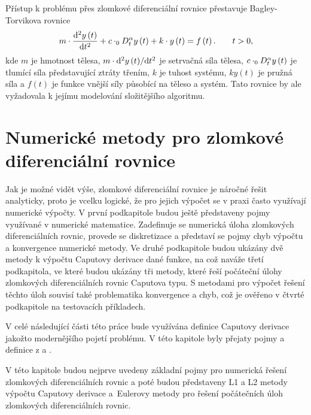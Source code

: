 \documentclass[a4paper,12pt,twoside]{article}
\theoremstyle{definition}
\theoremstyle{remark}
\numberwithin{equation}{section}
\numberwithin{table}{section}
\numberwithin{figure}{section}
\newcommand{\dx}[1]{\mathrm{d} #1}
\begin{document}
Přístup k problému přes zlomkové diferenciální rovnice přestavuje Bagley-Torvikova rovnice
\begin{equation}
	m\cdot \frac{\dx ^{2} y\left(t\right)}{\dx t^{2}} + c\cdot _{0}D^{\alpha}_{t} y\left(t\right) +k \cdot y\left(t\right) = f\left(t\right). \qquad t > 0,
\end{equation}
kde $m$ je hmotnost tělesa, $m\cdot {\dx ^{2} y\left(t\right)}/{\dx t^{2}}$ je setrvačná síla tělesa, $c\cdot \space _{0}D^{\alpha}_{t} y\left(t\right)$ je tlumící síla představující ztráty třením, $k$ je tuhost systému, $ky\left(t\right)$ je pružná síla a $f\left(t\right)$ je funkce vnější síly působící na těleso a systém. \cite{ChenInMechanics}
Tato rovnice by ale vyžadovala k jejímu modelování složitějšího algoritmu.

\newpage
\section{Numerické metody pro zlomkové diferenciální rovnice}
Jak je možné vidět výše, zlomkové diferenciální rovnice je náročné řešit analyticky, proto je vcelku logické, že pro jejich výpočet se v praxi často využívají numerické výpočty. 
V první podkapitole budou ještě představeny pojmy využívané v numerické matematice. Zadefinuje se numerická úloha zlomkových diferenciálních rovnic, provede se diskretizace a představí se pojmy chyb výpočtu a konvergence numerické metody.
Ve druhé podkapitole budou ukázány dvě metody k výpočtu Caputovy derivace dané funkce, na což naváže třetí podkapitola, ve které budou ukázány tři metody, které řeší počáteční úlohy zlomkových diferenciálních rovnic Caputova typu. S metodami pro výpočet řešení těchto úloh souvisí také problematika konvergence a chyb, což je ověřeno v čtvrté podkapitole na testovacích příkladech. %

V celé následující části této práce bude využívána definice Caputovy derivace jakožto modernějšího pojetí problému. V této kapitole byly přejaty pojmy a definice z \cite{NumMetody} a \cite{Cangpin}.

V této kapitole budou nejprve uvedeny základní pojmy pro numerická řešení zlomkových diferenciálních rovnic a poté budou  představeny L1 a L2 metody výpočtu Caputovy derivace a~Eulerovy metody pro řešení počátečních úloh zlomkových diferenciálních rovnic.
\end{document}
